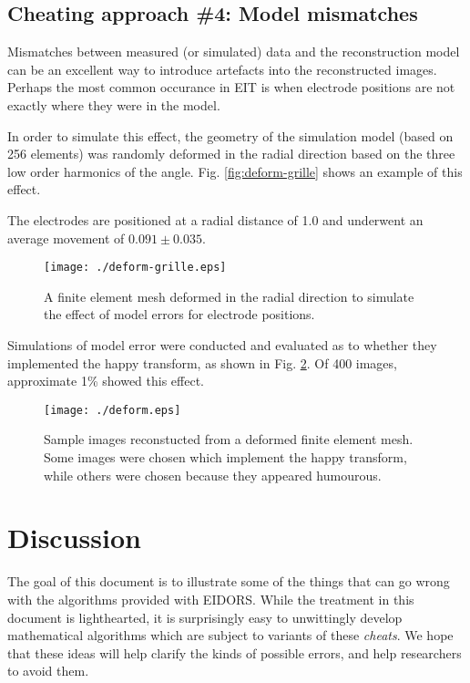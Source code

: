 \documentclass[12pt]{iopart}
\begin{document}
\subsection{ Cheating approach \#4:
             Model mismatches}

Mismatches between measured (or simulated) data and the
reconstruction model can be an excellent way to introduce
artefacts into the reconstructed images. Perhaps the
most common occurance in EIT is when electrode positions
are not exactly where they were in the model.

In order to simulate this effect, the geometry of
the simulation model (based on 256 elements) was randomly
deformed in the radial direction based on the three low
order harmonics of the angle.
Fig. \ref{fig:deform-grille} shows an example
of this effect.

The electrodes are positioned at a radial distance of 1.0
and underwent an average movement of $0.091\pm0.035$.

%
%
\begin{figure}[th]
\begin{flushright}
\texttt{[image: ./deform-grille.eps]}
\caption{\small 
A finite element mesh deformed in the radial direction to
simulate the effect of model errors for electrode positions.
 }
 \label{fig:deform}
\end{flushright}
\end{figure}

Simulations of model error were conducted and evaluated as
to whether they implemented the happy transform, as shown
in Fig. \ref{fig:deform}.
Of 400 images, approximate 1\% showed this effect. 

%
%
\begin{figure}[th]
\begin{flushright}
\texttt{[image: ./deform.eps]}
\caption{\small 
Sample images reconstucted from a deformed finite element
mesh. Some images were chosen which implement the happy
transform, while others were chosen because they appeared
humourous.
 }
 \label{fig:deform}
\end{flushright}
\end{figure}


\section{
 Discussion
}

The goal of this document is to illustrate some of the things
that can go wrong with the algorithms provided with EIDORS.
While the treatment in this document is lighthearted, it
is surprisingly easy to unwittingly develop mathematical
algorithms which are subject to variants of these {\em cheats}.
We hope that these ideas will help clarify the kinds of
possible errors, and help researchers to avoid them.
\end{document}
